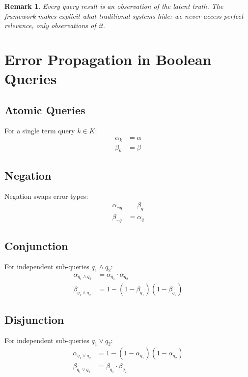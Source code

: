 \documentclass[11pt,final,hidelinks]{article}
\newtheorem{remark}[theorem]{Remark}
\newcommand{\fprate}{\alpha}
\newcommand{\fnrate}{\beta}
\begin{document}
\begin{remark}
Every query result is an observation of the latent truth. The framework makes explicit what traditional systems hide: we never access perfect relevance, only observations of it.
\end{remark}

\section{Error Propagation in Boolean Queries}

\subsection{Atomic Queries}

For a single term query $k \in K$:
\begin{align}
\fprate_k &= \fprate \\
\fnrate_k &= \fnrate
\end{align}

\subsection{Negation}

Negation swaps error types:
\begin{align}
\fprate_{\neg q} &= \fnrate_q \\
\fnrate_{\neg q} &= \fprate_q
\end{align}

\subsection{Conjunction}

For independent sub-queries $q_1 \land q_2$:
\begin{align}
\fprate_{q_1 \land q_2} &= \fprate_{q_1} \cdot \fprate_{q_2} \\
\fnrate_{q_1 \land q_2} &= 1 - (1 - \fnrate_{q_1})(1 - \fnrate_{q_2})
\end{align}

\subsection{Disjunction}

For independent sub-queries $q_1 \lor q_2$:
\begin{align}
\fprate_{q_1 \lor q_2} &= 1 - (1 - \fprate_{q_1})(1 - \fprate_{q_2}) \\
\fnrate_{q_1 \lor q_2} &= \fnrate_{q_1} \cdot \fnrate_{q_2}
\end{align}
\end{document}
